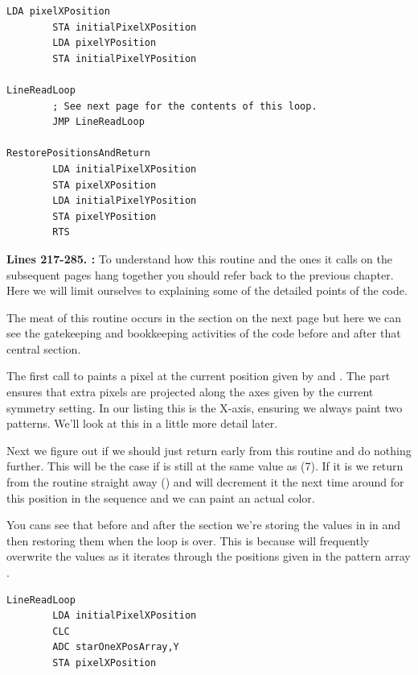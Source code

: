 {\begin{lstlisting}[caption = The routine responsible for orchestrating the pattern painting.]
        LDA pixelXPosition
        STA initialPixelXPosition
        LDA pixelYPosition
        STA initialPixelYPosition

LineReadLoop   
        ; See next page for the contents of this loop.
        JMP LineReadLoop

RestorePositionsAndReturn   
        LDA initialPixelXPosition
        STA pixelXPosition
        LDA initialPixelYPosition
        STA pixelYPosition
        RTS 

\end{lstlisting}
\clearpage

\textbf{Lines 217-285. :} To understand how this routine and the ones it calls on the subsequent pages hang together you should refer
back to the previous chapter. Here we will limit ourselves to explaining some of the detailed points of the
code.

The meat of this routine occurs in the  section on the next page but here we can see the
gatekeeping and bookkeeping activities of the code before and after that central section. 

The first call to  paints a pixel at the current position given by 
 and . The  part ensures that extra
pixels are projected along the axes given by the current symmetry setting. In our listing this is the
X-axis, ensuring we always paint two patterns. We'll look at this in a little more detail later.

Next we figure out if we should just return early from this routine and do nothing further. This will be the
case if  is still at the same value as  (7). If it is
we return from the routine straight away () and
 will decrement it the next time around for this position
in the sequence and we can paint an actual color.

You cans see that before and after the  section we're storing the values in  in
 and then restoring them when the loop is over. This is because 
will frequently overwrite the values as it iterates through the positions given in the pattern array .

\clearpage
\begin{lstlisting}[caption=The core pattern-painting loop.]
LineReadLoop   
        LDA initialPixelXPosition
        CLC 
        ADC starOneXPosArray,Y
        STA pixelXPosition


\end{lstlisting}}
